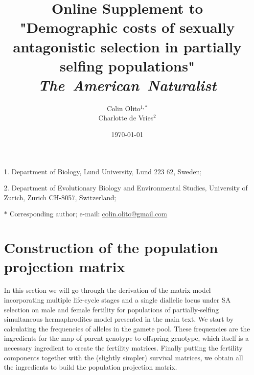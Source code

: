 \documentclass[11pt]{article}
\title{Online Supplement to "Demographic costs of sexually antagonistic selection in partially selfing populations" \\ 
\textit{The~American~Naturalist} }
\author{Colin Olito$^{1,\ast}$ \\ 
Charlotte de Vries$^{2}$}
\date{\today}
\begin{document}
\maketitle

\noindent{} 1. Department of Biology, Lund University, Lund 223 62, Sweden;

\noindent{} 2.  Department of Evolutionary Biology and Environmental Studies, University of Zurich, Zurich CH-8057, Switzerland;

\noindent{} $\ast$ Corresponding author; e-mail: \url{colin.olito@gmail.com}



% 
%
%

\renewcommand{\theequation}{S\arabic{equation}}
\renewcommand{\thetable}{S\arabic{table}}
\renewcommand{\thesection}{Supplement~\arabic{section}}
\renewcommand{\thefigure}{S\arabic{figure}}
\setcounter{equation}{0}  %
\setcounter{figure}{0}
\setcounter{table}{0}


\newpage{}
\section{Construction of the population projection matrix}

In this section we will go through the derivation of the matrix model incorporating multiple life-cycle stages and a single diallelic locus under SA selection on male and female fertility for populations of partially-selfing simultaneous hermaphrodites model presented in the main text. We start by calculating the frequencies of alleles in the gamete pool. These frequencies are the ingredients for the map of parent genotype to offspring genotype, which itself is a necessary ingredient to create the fertility matrices. Finally putting the fertility components together with the (slightly simpler) survival matrices, we obtain all the ingredients to build the population projection matrix. 
\end{document}
